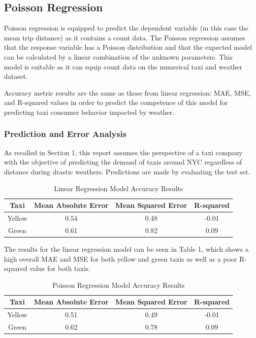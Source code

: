 \documentclass[11pt]{article}
\begin{document}
\subsection{Poisson Regression}
Poisson regression is equipped to predict the dependent variable (in this case the mean trip distance) as it contains a count data. The Poisson regression assumes that the response variable has a Poisson distribution and that the expected model can be calculated by a linear combination of the unknown parameters. This model is suitable as it can equip count data on the numerical taxi and weather dataset.

Accuracy metric results are the same as those from linear regression: MAE, MSE, and R-squared values in order to predict the competence of this model for predicting taxi consumer behavior impacted by weather.

\subsubsection{Prediction and Error Analysis}
As recalled in Section 1, this report assumes the perspective of a taxi company with the objective of predicting the demand of taxis around NYC regardless of distance during drastic weathers. Predictions are made by evaluating the test set.
\begin{table}[h!]
\centering
\begin{tabular}{||c c c c||} 
 \hline
 Taxi & Mean Absolute Error & Mean Squared Error & R-squared \\ [0.5ex] 
 \hline\hline
 Yellow & 0.54 & 0.48 & -0.01\\ 
 \hline
 Green & 0.61 & 0.82 & 0.09\\
 \hline
\end{tabular}
\caption{Linear Regression Model Accuracy Results}
\label{table:1}
\end{table}

The results for the linear regression model can be seen in Table 1, which shows a high overall MAE and MSE for both yellow and green taxis as well as a poor R-squared value for both taxis. 

\begin{table}[h!]
\centering
\begin{tabular}{||c c c c||} 
 \hline
 Taxi & Mean Absolute Error & Mean Squared Error & R-squared \\ [0.5ex] 
 \hline\hline
 Yellow & 0.51 & 0.49 & -0.01\\ 
 \hline
 Green & 0.62 & 0.78 & 0.09\\
 \hline
\end{tabular}
\caption{Poisson Regression Model Accuracy Results}
\label{table:2}
\end{table}
\end{document}
